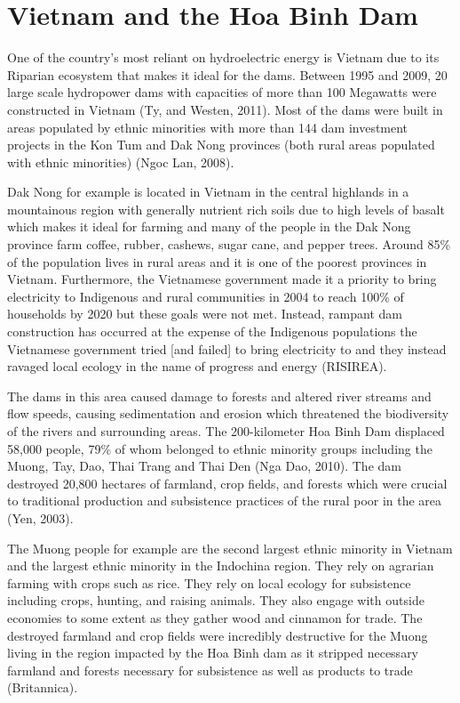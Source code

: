 \documentclass{book}\usepackage{knitr}
\begin{document}
{\section{Vietnam and the Hoa Binh Dam}
  One of the country's most reliant on hydroelectric energy is Vietnam due to its Riparian ecosystem that makes it ideal for the dams. Between 1995 and 2009, 20 large scale hydropower dams with capacities of more than 100 Megawatts were constructed in Vietnam (Ty, and Westen, 2011). Most of the dams were built in areas populated by ethnic minorities with more than 144 dam investment projects in the Kon Tum and Dak Nong provinces (both rural areas populated with ethnic minorities) (Ngoc Lan, 2008). 
  
  Dak Nong for example is located in Vietnam in the central highlands in a mountainous region with generally nutrient rich soils due to high levels of basalt which makes it ideal for farming and many of the people in the Dak Nong province farm coffee, rubber, cashews, sugar cane, and pepper trees. Around 85\% of the population lives in rural areas and it is one of the poorest provinces in Vietnam. Furthermore, the Vietnamese government made it a priority to bring electricity to Indigenous and rural communities in 2004 to reach 100\% of households by 2020 but these goals were not met. Instead, rampant dam construction has occurred at the expense of the Indigenous populations the Vietnamese government tried [and failed] to bring electricity to and they instead ravaged local ecology in the name of progress and energy (RISIREA). 
  
  The dams in this area caused damage to forests and altered river streams and flow speeds, causing sedimentation and erosion which threatened the biodiversity of the rivers and surrounding areas. The 200-kilometer Hoa Binh Dam displaced 58,000 people, 79\% of whom belonged to ethnic minority groups including the Muong, Tay, Dao, Thai Trang and Thai Den (Nga Dao, 2010). The dam destroyed 20,800 hectares of farmland, crop fields, and forests which were crucial to traditional production and subsistence practices of the rural poor in the area (Yen, 2003). 
  
  The Muong people for example are the second largest ethnic minority in Vietnam and the largest ethnic minority in the Indochina region. They rely on agrarian farming with crops such as rice. They rely on local ecology for subsistence including crops, hunting, and raising animals. They also engage with outside economies to some extent as they gather wood and cinnamon for trade. The destroyed farmland and crop fields were incredibly destructive for the Muong living in the region impacted by the Hoa Binh dam as it stripped necessary farmland and forests necessary for subsistence as well as products to trade (Britannica). 
  
}
\end{document}
